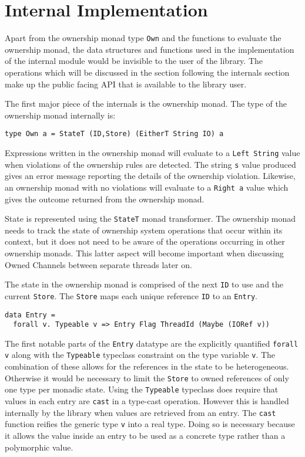 \documentclass[onehalf,11pt]{beavtex}
\begin{document}
\section{Internal Implementation}

Apart from the ownership monad type \texttt{Own} and the functions to evaluate
the ownership monad, the data structures and functions used in the
implementation of the internal module would be invisible to the user of the
library.
The operations which will be discussed in the section following the internals
section make up the public facing API that is available to the library user.

The first major piece of the internals is the ownership monad.
The type of the ownership monad internally is:

\begin{verbatim}
type Own a = StateT (ID,Store) (EitherT String IO) a
\end{verbatim}

Expressions written in the ownership monad will evaluate to a
\texttt{Left String} value when violations of the ownership rules are detected.
The string \texttt{s} value produced gives an error message reporting the
details of the ownership violation.
Likewise, an ownership monad with no violations will evaluate to a
\texttt{Right a} value which gives the outcome returned from the ownership monad.

State is represented using the \texttt{StateT} monad transformer.
The ownership monad needs to track the state of ownership system operations that
occur within its context, but it does not need to be aware of the operations
occurring in other ownership monads.
This latter aspect will become important when discussing Owned Channels between
separate threads later on.

The state in the ownership monad is comprised of the next \texttt{ID}
to use and the current \texttt{Store}.  The \texttt{Store} maps each unique
reference \texttt{ID} to an \texttt{Entry}.

\begin{verbatim}
data Entry =
  forall v. Typeable v => Entry Flag ThreadId (Maybe (IORef v))
\end{verbatim}

The first notable parts of the \texttt{Entry} datatype are the explicitly
quantified \texttt{forall v} along with the \texttt{Typeable} typeclass
constraint on the type variable \texttt{v}.
The combination of these allows for the references in the state to be
heterogeneous.
Otherwise it would be necessary to limit the \texttt{Store} to owned
references of only one type per monadic state. %
Using the \texttt{Typeable} typeclass does require that values in each entry are
\texttt{cast} in a type-cast operation.  However this is handled internally
by the library when values are retrieved from an entry.
The \texttt{cast} function reifies the generic type \texttt{v} into a real
type.
Doing so is necessary because it allows the value inside an entry to be used
as a concrete type rather than a polymorphic value.
\end{document}
